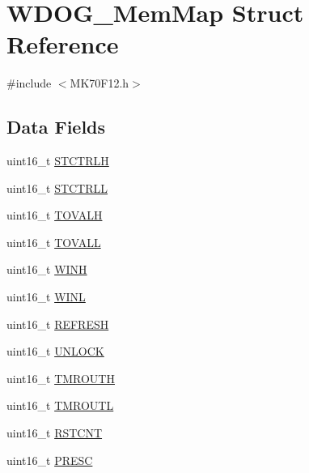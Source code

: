 \hypertarget{struct_w_d_o_g___mem_map}{}\section{W\+D\+O\+G\+\_\+\+Mem\+Map Struct Reference}
\label{struct_w_d_o_g___mem_map}


{\ttfamily \#include $<$M\+K70\+F12.\+h$>$}

\subsection*{Data Fields}
\begin{DoxyCompactItemize}
\item 
uint16\+\_\+t \hyperlink{struct_w_d_o_g___mem_map_ae48286fe7c8ceabfd9aa616e40b52a35}{S\+T\+C\+T\+R\+L\+H}
\item 
uint16\+\_\+t \hyperlink{struct_w_d_o_g___mem_map_a0eb14eade4d91bd2f2f82910d633e0aa}{S\+T\+C\+T\+R\+L\+L}
\item 
uint16\+\_\+t \hyperlink{struct_w_d_o_g___mem_map_ae5ac6a42d85914d2f739b5377734f87a}{T\+O\+V\+A\+L\+H}
\item 
uint16\+\_\+t \hyperlink{struct_w_d_o_g___mem_map_a2ce5a77ef35f55b7f60a11757dbd758f}{T\+O\+V\+A\+L\+L}
\item 
uint16\+\_\+t \hyperlink{struct_w_d_o_g___mem_map_a86589dc11cb4b7d3a00be9234372591f}{W\+I\+N\+H}
\item 
uint16\+\_\+t \hyperlink{struct_w_d_o_g___mem_map_af238938251c1f5904a215c8a4ed1b74d}{W\+I\+N\+L}
\item 
uint16\+\_\+t \hyperlink{struct_w_d_o_g___mem_map_a5dbb3963b38571b0de1d2db7bd89d46a}{R\+E\+F\+R\+E\+S\+H}
\item 
uint16\+\_\+t \hyperlink{struct_w_d_o_g___mem_map_a78988c0aeb0693a231757a4cc164e1bf}{U\+N\+L\+O\+C\+K}
\item 
uint16\+\_\+t \hyperlink{struct_w_d_o_g___mem_map_a47bce5f5c4ea1609ec9d0055e05e9b73}{T\+M\+R\+O\+U\+T\+H}
\item 
uint16\+\_\+t \hyperlink{struct_w_d_o_g___mem_map_a873a6456ac56cb42a5a2ff66ddfefa3c}{T\+M\+R\+O\+U\+T\+L}
\item 
uint16\+\_\+t \hyperlink{struct_w_d_o_g___mem_map_aad95a949933f4c578786a38a2ffeec4a}{R\+S\+T\+C\+N\+T}
\item 
uint16\+\_\+t \hyperlink{struct_w_d_o_g___mem_map_a8d00541f19094160ea06d8c7ded60298}{P\+R\+E\+S\+C}
\end{DoxyCompactItemize}


